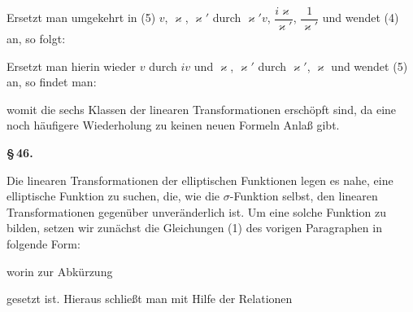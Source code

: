 
Ersetzt man umgekehrt in (5) $v$, $\varkappa$, $\varkappa'$ durch $\varkappa'v$, $\dfrac{i\varkappa}{\varkappa'}$, $\dfrac{1}{\varkappa'}$ und wendet (4) an, so folgt:


Ersetzt man hierin wieder $v$ durch $iv$ und $\varkappa$, $\varkappa'$ durch $\varkappa'$, $\varkappa$ und wendet (5) an, so findet man:


womit die sechs Klassen der linearen Transformationen erschöpft sind, da eine noch häufigere Wiederholung zu keinen neuen Formeln Anlaß gibt.

\begin{center}
\textbf{\S\,46. }
\end{center}

Die linearen Transformationen der elliptischen Funktionen legen es nahe, eine elliptische Funktion zu suchen, die, wie die $\sigma$-Funktion selbst, den linearen Transformationen gegenüber unveränderlich ist. Um eine solche Funktion zu bilden, setzen wir zunächst die Gleichungen (1) des vorigen Paragraphen in folgende Form:


worin zur Abkürzung


gesetzt ist. Hieraus schließt man mit Hilfe der Relationen

